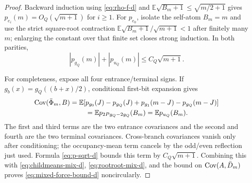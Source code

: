 \documentclass[11pt]{article}
\numberwithin{equation}{section}
\newcommand{\E}{\mathbb E}\newcommand{\Pp}{\mathbb P}
\newcommand{\1}{\mathbf 1}\newcommand{\F}{\mathcal F}\newcommand{\D}{\mathcal D}
\begin{document}
\begin{proof}
Backward induction using \eqref{eq:rho-f-d} and
$\E\sqrt{B_m+1}\le\sqrt{m/2+1}$ gives $p_{e_i}(m)=O_Q(\sqrt{m+1})$
for $i\ge1$.  For $p_{e_0}$, isolate the self-atom $B_m=m$ and use the
strict square-root contraction
$\E\sqrt{B_m+1}/\sqrt{m+1}<1$ after finitely many $m$; enlarging the
constant over that finite set closes strong induction.  In both parities,
\begin{equation}|p_{g_Q}(m)|+|p_{u_Q}(m)|\le C_Q\sqrt{m+1}.\label{eq:p-sqrt-d}\end{equation}

For completeness, expose all four entrance/terminal signs.  If
$g_b(x)=g_Q((b+x)/2)$, conditional first-bit expansion gives
\begin{align*}
 \Cov(\bar\Phi_m,B)=\E[&p_{g_0}(J)-p_{g_Q}(J)
 +p_{g_1}(m-J)-p_{g_Q}(m-J)]\\
 &=\E p_{2Pg_Q-2g_Q}(B_m)=\E p_{u_Q}(B_m).             \label{eq:four-endpoints-d}
\end{align*}
The first and third terms are the two entrance covariances and the second
and fourth are the two terminal covariances.  Cross-branch covariances vanish
only after conditioning; the occupancy-mean term cancels by the odd/even
reflection just used.  Formula \eqref{eq:p-sqrt-d} bounds this term by
$C_Q\sqrt{m+1}$.  Combining this with
\eqref{eq:childmeans-mix-d}, \eqref{eq:rootroot-mix-d}, and the bound on
$\operatorname{Cov}(A,\bar D_m)$ proves \eqref{eq:mixed-force-bound-d} noncircularly.
\end{proof}
\end{document}
